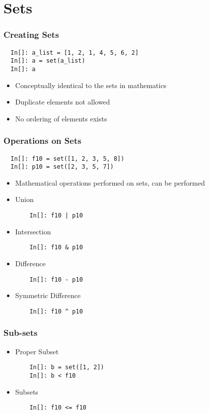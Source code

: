 \section{Sets}

\begin{frame}[fragile]
  \frametitle{Creating Sets}
  \begin{lstlisting}
  In[]: a_list = [1, 2, 1, 4, 5, 6, 2]
  In[]: a = set(a_list)
  In[]: a
  \end{lstlisting}
  \begin{itemize}
  \item Conceptually identical to the sets in mathematics
  \item Duplicate elements not allowed
  \item No ordering of elements exists
  \end{itemize}
\end{frame}

\begin{frame}[fragile]
  \frametitle{Operations on Sets}
  \begin{lstlisting}
  In[]: f10 = set([1, 2, 3, 5, 8])
  In[]: p10 = set([2, 3, 5, 7])
  \end{lstlisting}
  \begin{itemize}
  \item Mathematical operations performed on sets, can be performed
  \end{itemize}
  \begin{itemize}
  \item Union
    \begin{lstlisting}
    In[]: f10 | p10
    \end{lstlisting}
  \item Intersection
    \begin{lstlisting}
    In[]: f10 & p10
    \end{lstlisting}
  \item Difference
    \begin{lstlisting}
    In[]: f10 - p10
    \end{lstlisting}
  \item Symmetric Difference
    \begin{lstlisting}
    In[]: f10 ^ p10
    \end{lstlisting}
  \end{itemize}
\end{frame}

\begin{frame}[fragile]
  \frametitle{Sub-sets}
  \begin{itemize}
  \item Proper Subset
    \begin{lstlisting}
    In[]: b = set([1, 2])
    In[]: b < f10
    \end{lstlisting}
  \item Subsets
    \begin{lstlisting}
    In[]: f10 <= f10
    \end{lstlisting}
  \end{itemize}
\end{frame}

